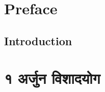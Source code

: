 \documentclass[12pt,twoside,openright,a5paper]{book}
\date{} %
\begin{document}




\thispagestyle{empty}
\frontmatter

\doublespacing
\tableofcontents
\singlespacing

\thispagestyle{empty}
\thispagestyle{empty}
\pagestyle{fancy}


\chapter{Preface}

\begin{onehalfspace}
\chapter{Introduction}

\end{onehalfspace}
\mainmatter

\chapter{\devfont १ अर्जुन विशादयोग}

%
\makeatletter\@openrightfalse
\printindex

\end{document}
